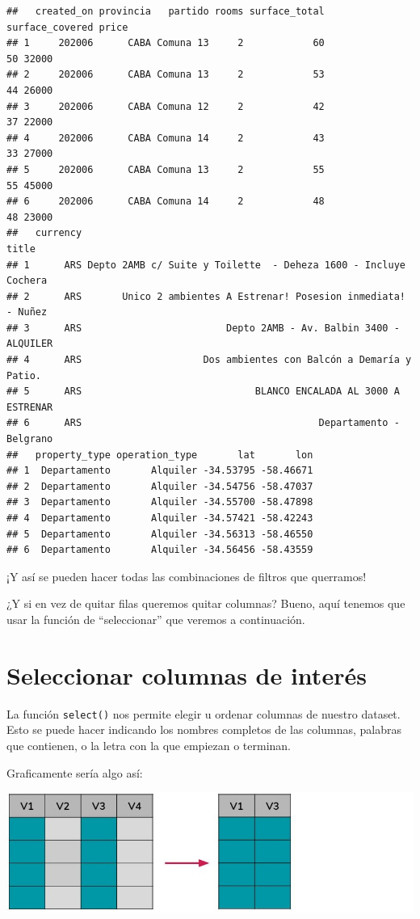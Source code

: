 \documentclass[
  spanish,
]{book}
\begin{document}
\begin{verbatim}
##   created_on provincia   partido rooms surface_total surface_covered price
## 1     202006      CABA Comuna 13     2            60              50 32000
## 2     202006      CABA Comuna 13     2            53              44 26000
## 3     202006      CABA Comuna 12     2            42              37 22000
## 4     202006      CABA Comuna 14     2            43              33 27000
## 5     202006      CABA Comuna 13     2            55              55 45000
## 6     202006      CABA Comuna 14     2            48              48 23000
##   currency                                                           title
## 1      ARS Depto 2AMB c/ Suite y Toilette  - Deheza 1600 - Incluye Cochera
## 2      ARS       Unico 2 ambientes A Estrenar! Posesion inmediata! - Nuñez
## 3      ARS                         Depto 2AMB - Av. Balbin 3400 - ALQUILER
## 4      ARS                     Dos ambientes con Balcón a Demaría y Patio.
## 5      ARS                              BLANCO ENCALADA AL 3000 A ESTRENAR
## 6      ARS                                         Departamento - Belgrano
##   property_type operation_type       lat       lon
## 1  Departamento       Alquiler -34.53795 -58.46671
## 2  Departamento       Alquiler -34.54756 -58.47037
## 3  Departamento       Alquiler -34.55700 -58.47898
## 4  Departamento       Alquiler -34.57421 -58.42243
## 5  Departamento       Alquiler -34.56313 -58.46550
## 6  Departamento       Alquiler -34.56456 -58.43559
\end{verbatim}

¡Y así se pueden hacer todas las combinaciones de filtros que querramos!

¿Y si en vez de quitar filas queremos quitar columnas? Bueno, aquí tenemos que usar la función de ``seleccionar'' que veremos a continuación.

\hypertarget{seleccionar-columnas-de-interuxe9s}{%
\section{Seleccionar columnas de interés}\label{seleccionar-columnas-de-interuxe9s}}

La función \texttt{select()} nos permite elegir u ordenar columnas de nuestro dataset. Esto se puede hacer indicando los nombres completos de las columnas, palabras que contienen, o la letra con la que empiezan o terminan.

Graficamente sería algo así:

\includegraphics{images/tidyverse_seleccionar.jpg}
\end{document}
